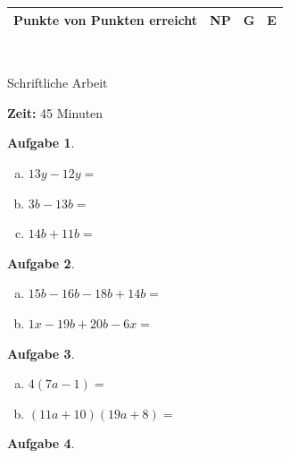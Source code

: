 \documentclass[12pt,fleqn]{article}
\theoremstyle{aufg}
\newtheorem{aufgabe}{Aufgabe}
\theoremstyle{bsp}
\begin{document}
 
    \begin{flushleft}
\renewcommand{\arraystretch}{2.15} 
\begin{tabular}{|p{10cm}|p{2cm}|p{2cm}|p{2cm}|} 
\hline 
\hspace{2cm} Punkte von \qquad30\qquad Punkten erreicht & \hspace{1.2cm} NP & G & E \\ 
\hline 
\end{tabular} \\[1em]    
\begin{center}{\Large Schriftliche Arbeit}\end{center} 
{\bf Zeit: }45 Minuten\\ 
\begin{aufgabe} ~ \\ 
\begin{multicols}{3} 
\begin{enumerate}[a)] 
\item 
$13y-12y=$
\item 
$3b-13b=$
\item 
$14b+11b=$
\end{enumerate} 
\end{multicols} 
\end{aufgabe} 
\begin{aufgabe} ~ \\ 
\begin{multicols}{2} 
\begin{enumerate}[a)] 
\item 
$15b-16b-18b+14b=$
\item 
$1x-19b+20b-6x=$
\end{enumerate} 
\end{multicols} 
\end{aufgabe} 
\begin{aufgabe} ~ \\ 
\begin{multicols}{2} 
\begin{enumerate}[a)] 
\item 
$4(7a-1)=$
\item 
$(11a+10)(19a+8)=$
\end{enumerate} 
\end{multicols} 
\end{aufgabe} 
\begin{aufgabe} ~ \\ 
\begin{multicols}{3} 
\begin{enumerate}[a)] 

\end{enumerate}
\end{multicols}
\end{aufgabe}
\end{flushleft}
\end{document}
